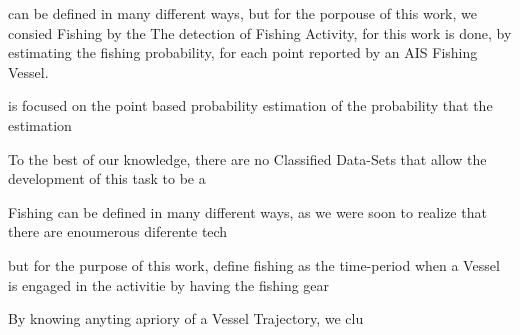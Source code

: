 can be defined in many different ways, but for the porpouse of this work, we consied Fishing by the 
The detection of Fishing Activity, for this work is done, by estimating the fishing probability, for each point reported by an AIS Fishing Vessel. 

is focused on the point based probability estimation of the probability that the estimation 

To the best of our knowledge, there are no Classified Data-Sets that allow the development of this task to be a 

Fishing can be defined in many different ways, as we were soon to realize that there are enoumerous diferente tech

but for the purpose of this work, define fishing as the time-period when a Vessel is engaged in the activitie by having the fishing gear 

By knowing anyting apriory of a Vessel Trajectory, we clu



